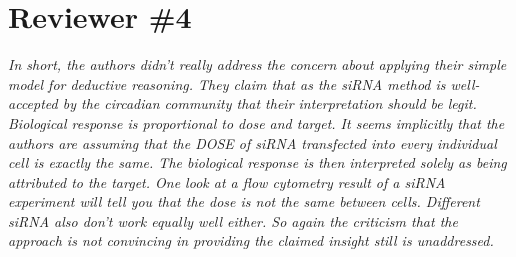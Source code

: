 \documentclass[11pt, letterpaper]{article}
\newenvironment{reviewer}{\itshape\color{gray}}{}
\begin{document}
\section*{Reviewer \#4}

\begin{reviewer}
In short, the authors didn't really address the concern about applying their simple model for deductive reasoning. They claim that as the siRNA method is well-accepted by the circadian community that their interpretation should be legit. Biological response is proportional to dose and target. It seems implicitly that the authors are assuming that the DOSE of siRNA transfected into every individual cell is exactly the same. The biological response is then interpreted solely as being attributed to the target. One look at a flow cytometry result of a siRNA experiment will tell you that the dose is not the same between cells. Different siRNA also don't work equally well either. So again the criticism that the approach is not convincing in providing the claimed insight still is unaddressed.
\end{reviewer}
\end{document}
